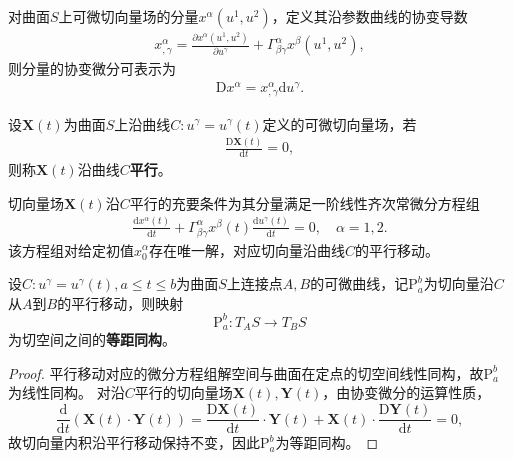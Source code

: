 \documentclass[../../main.tex]{subfiles}%
\begin{document}
对曲面$S$上可微切向量场的分量$x^\alpha(u^1,u^2)$，定义其沿参数曲线的协变导数
\begin{align*}
x^\alpha_{,\gamma}=\frac{\partial x^\alpha(u^1,u^2)}{\partial u^\gamma}+\Gamma_{\beta\gamma}^\alpha x^\beta(u^1,u^2),
\end{align*}
则分量的协变微分可表示为
\begin{align*}
\mathrm{D}x^\alpha=x^\alpha_{,\gamma}\mathrm{d}u^\gamma.
\end{align*}

\begin{definition}
设$\boldsymbol{X}(t)$为曲面$S$上沿曲线$C:u^\gamma=u^\gamma(t)$定义的可微切向量场，若
\begin{align}
\frac{\mathrm{D}\boldsymbol{X}(t)}{\mathrm{d}t}=0,
\label{eq:parallel_def}
\end{align}
则称$\boldsymbol{X}(t)$沿曲线$C$\textbf{{平行}}。
\end{definition}

\begin{remark}
切向量场$\boldsymbol{X}(t)$沿$C$平行的充要条件为其分量满足一阶线性齐次常微分方程组
\begin{align}
\frac{\mathrm{d}x^\alpha(t)}{\mathrm{d}t}+\Gamma_{\beta\gamma}^\alpha x^\beta(t)\frac{\mathrm{d}u^\gamma(t)}{\mathrm{d}t}=0,\quad \alpha=1,2.
\label{eq:parallel_ode}
\end{align}
该方程组对给定初值$x_0^\alpha$存在唯一解，对应切向量沿曲线$C$的平行移动。
\end{remark}

\begin{theorem}
设$C:u^\gamma=u^\gamma(t),a\leqslant t\leqslant b$为曲面$S$上连接点$A,B$的可微曲线，记$\mathrm{P}_a^b$为切向量沿$C$从$A$到$B$的平行移动，则映射
\[
\mathrm{P}_a^b:T_A S\to T_B S
\]
为切空间之间的\textbf{等距同构}。
\end{theorem}

\begin{proof}

平行移动对应的微分方程组解空间与曲面在定点的切空间线性同构，故$\mathrm{P}_a^b$为线性同构。
对沿$C$平行的切向量场$\boldsymbol{X}(t),\boldsymbol{Y}(t)$，由协变微分的运算性质，
\[
\frac{\mathrm{d}}{\mathrm{d}t}(\boldsymbol{X}(t)\cdot\boldsymbol{Y}(t))=\frac{\mathrm{D}\boldsymbol{X}(t)}{\mathrm{d}t}\cdot\boldsymbol{Y}(t)+\boldsymbol{X}(t)\cdot\frac{\mathrm{D}\boldsymbol{Y}(t)}{\mathrm{d}t}=0,
\]
故切向量内积沿平行移动保持不变，因此$\mathrm{P}_a^b$为等距同构。

\end{proof}
\end{document}
